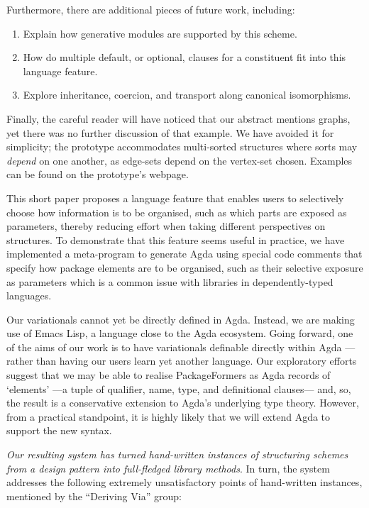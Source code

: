 \documentclass[sigplan,screen]{acmart}
\begin{document}
Furthermore, there are additional pieces of future work, including:

\begin{enumerate}
\item Explain how generative modules \cite{modular_modules}
are supported by this scheme.

\item How do multiple default, or optional, clauses for a constituent fit into this
language feature.

\item Explore inheritance, coercion, and transport along canonical isomorphisms.
\end{enumerate}

\noindent
Finally, the careful reader will have noticed
that our abstract mentions graphs, yet
there was no further discussion of that example.
We have avoided it for simplicity;
the prototype accommodates multi-sorted structures where
sorts may \emph{depend} on one another, as edge-sets
depend on the vertex-set chosen. Examples can be found on the prototype's
webpage.

This short paper proposes a language feature that enables users to selectively
choose how information is to be organised, such as which parts are exposed as parameters,
thereby reducing effort when taking different perspectives on structures.
To demonstrate that this feature seems useful in practice,
we have implemented a meta-program to generate Agda using special code comments
that specify how package elements are to be organised, such as their selective exposure
as parameters which is a common issue with libraries in dependently-typed languages.

Our variationals
cannot yet be directly defined in Agda. Instead, we are making use of Emacs Lisp, a language
close to the Agda ecosystem. Going forward, one of the aims of our work is to have variationals
definable directly within Agda ---rather than having our users learn yet another language.
Our exploratory efforts suggest that we may be able to realise \textsf{PackageFormer}s as Agda records
of ‘elements’ ---a tuple of qualifier, name, type, and definitional clauses---
and, so, the result is a conservative extension to Agda's underlying type theory.
However, from a practical standpoint, it is highly
likely that we will extend Agda to support the new syntax.

\emph{Our resulting system has turned hand-written instances of structuring schemes from a design}
\emph{pattern into full-fledged library methods}. In turn, the system addresses the following
extremely unsatisfactory points of hand-written instances, mentioned by the “Deriving Via” \cite{deriving_via} group:
\end{document}
